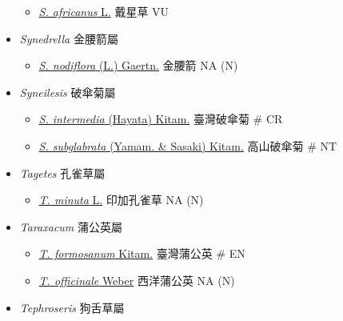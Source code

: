 \begin{itemize}
  \begin{itemize}
        \item[] \href{http://www.theplantlist.org/tpl1.1/search?q=Sphaeranthus+africanus}{\textit{S. africanus} L.}   戴星草   VU
  \end{itemize}
 \item[] \textit{Synedrella} 金腰箭屬
                                
  \begin{itemize}
        \item[] \href{http://www.theplantlist.org/tpl1.1/search?q=Synedrella+nodiflora}{\textit{S. nodiflora} (L.) Gaertn.}   金腰箭   NA (N)
  \end{itemize}
 \item[] \textit{Syneilesis} 破傘菊屬
                                
  \begin{itemize}
        \item[] \href{http://www.theplantlist.org/tpl1.1/search?q=Syneilesis+intermedia}{\textit{S. intermedia} (Hayata) Kitam.}   臺灣破傘菊  \# CR
        \item[] \href{http://www.theplantlist.org/tpl1.1/search?q=Syneilesis+subglabrata}{\textit{S. subglabrata} (Yamam. \& Sasaki) Kitam.}   高山破傘菊  \# NT
  \end{itemize}
 \item[] \textit{Tagetes} 孔雀草屬
                                
  \begin{itemize}
        \item[] \href{http://www.theplantlist.org/tpl1.1/search?q=Tagetes+minuta}{\textit{T. minuta} L.}   印加孔雀草   NA (N)
  \end{itemize}
 \item[] \textit{Taraxacum} 蒲公英屬
                                
  \begin{itemize}
        \item[] \href{http://www.theplantlist.org/tpl1.1/search?q=Taraxacum+formosanum}{\textit{T. formosanum} Kitam.}   臺灣蒲公英  \# EN
        \item[] \href{http://www.theplantlist.org/tpl1.1/search?q=Taraxacum+officinale}{\textit{T. officinale} Weber}   西洋蒲公英   NA (N)
  \end{itemize}
 \item[] \textit{Tephroseris} 狗舌草屬
                                

\end{itemize}
